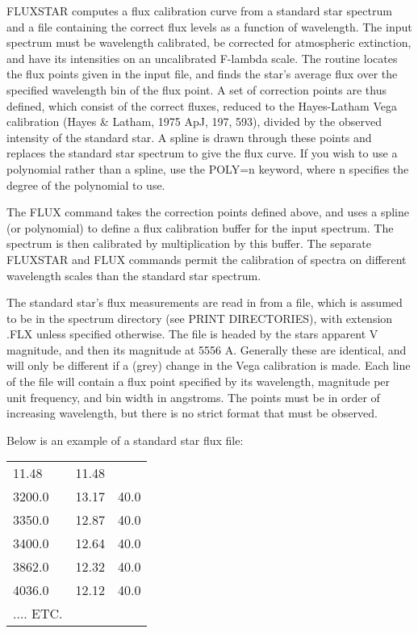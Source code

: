FLUXSTAR computes a flux calibration curve from a standard star spectrum
and a file containing the correct flux levels as a function of wavelength.
The input spectrum must be wavelength calibrated, be corrected for
atmospheric extinction, and have its intensities on an uncalibrated
F-lambda scale.  The routine locates the flux points given in the input
file, and finds the star's average flux over the specified wavelength bin
of the flux point.  A set of correction points are thus defined, which
consist of the correct fluxes, reduced to the Hayes-Latham Vega calibration
(Hayes \& Latham, 1975 ApJ, 197, 593), divided by the observed intensity of
the standard star.  A spline is drawn through these points and replaces the
standard star spectrum to give the flux curve. If you wish to use a
polynomial rather than a spline, use the POLY=n keyword, where n specifies
the degree of the polynomial to use.

The FLUX command takes the correction points defined above, and uses a
spline (or polynomial) to define a flux calibration buffer for the input
spectrum.  The spectrum is then calibrated by multiplication by this
buffer.  The separate FLUXSTAR and FLUX commands permit the calibration of
spectra on different wavelength scales than the standard star spectrum.

The standard star's flux measurements are read in from a file, which is
assumed to be in the spectrum directory (see PRINT DIRECTORIES), with
extension .FLX unless specified otherwise.  The file is headed by the stars
apparent V magnitude, and then its magnitude at 5556 A.  Generally these
are identical, and will only be different if a (grey) change in the Vega
calibration is made. Each line of the file will contain a flux point
specified by its wavelength, magnitude per unit frequency, and bin width in
angstroms.  The points must be in order of increasing wavelength, but there
is no strict format that must be observed.

Below is an example of a standard star flux file:

\begin{tabular}{lll}
       11.48&   11.48&\\
     3200.0 &   13.17 &40.0\\
     3350.0 &   12.87 &40.0\\
     3400.0 &   12.64 &40.0\\
     3862.0 &   12.32 &40.0\\
     4036.0 &   12.12 &40.0\\
.... ETC.&&\\
\end{tabular}

